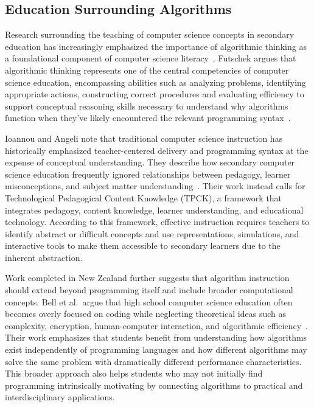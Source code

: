 
\subsection{Education Surrounding Algorithms}
Research surrounding the teaching of computer science concepts in secondary education has increasingly emphasized the importance of algorithmic
  thinking as a foundational component of computer science literacy~\cite{futschek2006algorithmic,bell2014presenting,gal2004efficiency}.
Futschek argues that algorithmic thinking represents one of the central competencies of computer science education, encompassing abilities such as
  analyzing problems, identifying appropriate actions, constructing correct procedures and evaluating efficiency to support conceptual reasoning skills
  necessary to understand why algorithms function when they've likely encountered the relevant programming syntax~\cite{futschek2006algorithmic}.

Ioannou and Angeli note that traditional computer science instruction has historically emphasized teacher-centered delivery and programming syntax at
  the expense of conceptual understanding.
They describe how secondary computer science education frequently ignored relationships between pedagogy, learner misconceptions, and subject matter
  understanding~\cite{ioan2013}.
Their work instead calls for Technological Pedagogical Content Knowledge (TPCK), a framework that integrates pedagogy, content knowledge, learner
  understanding, and educational technology.
According to this framework, effective instruction requires teachers to identify abstract or difficult concepts and use representations, simulations,
  and interactive tools to make them accessible to secondary learners due to the inherent abstraction.

Work completed in New Zealand further suggests that algorithm instruction should extend beyond programming itself and include broader computational
  concepts.
Bell et al.\
argue that high school computer science education often becomes overly focused on coding while neglecting theoretical ideas such as complexity, encryption, human-computer interaction, and algorithmic efficiency~\cite{bell2014presenting}.
Their work emphasizes that students benefit from understanding how algorithms exist independently of programming languages and how different
  algorithms may solve the same problem with dramatically different performance characteristics.
This broader approach also helps students who may not initially find programming intrinsically motivating by connecting algorithms to practical and
  interdisciplinary applications.

